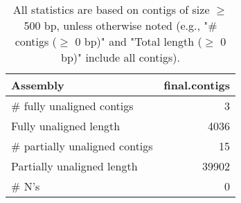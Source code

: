 \documentclass[12pt,a4paper]{article}
\begin{document}
\begin{table}[ht]
\begin{center}
\caption{All statistics are based on contigs of size $\geq$ 500 bp, unless otherwise noted (e.g., "\# contigs ($\geq$ 0 bp)" and "Total length ($\geq$ 0 bp)" include all contigs).}
\begin{tabular}{|l*{1}{|r}|}
\hline
Assembly & final.contigs \\ \hline
\# fully unaligned contigs & 3 \\ \hline
Fully unaligned length & 4036 \\ \hline
\# partially unaligned contigs & 15 \\ \hline
Partially unaligned length & 39902 \\ \hline
\# N's & 0 \\ \hline
\end{tabular}
\end{center}
\end{table}
\end{document}

